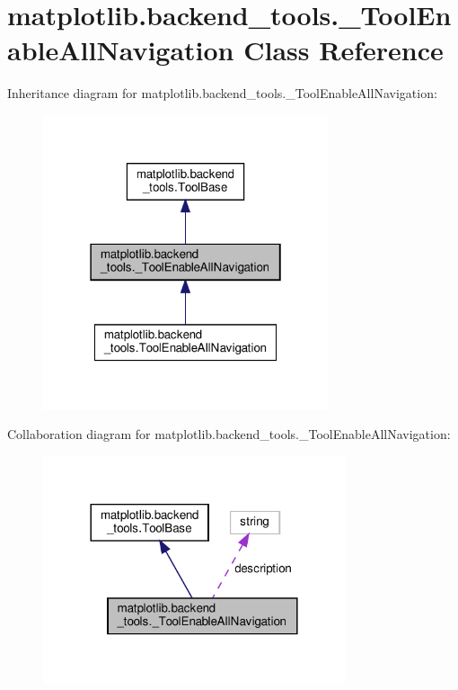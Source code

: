 \hypertarget{classmatplotlib_1_1backend__tools_1_1__ToolEnableAllNavigation}{}\section{matplotlib.\+backend\+\_\+tools.\+\_\+\+Tool\+Enable\+All\+Navigation Class Reference}
\label{classmatplotlib_1_1backend__tools_1_1__ToolEnableAllNavigation}


Inheritance diagram for matplotlib.\+backend\+\_\+tools.\+\_\+\+Tool\+Enable\+All\+Navigation\+:
\nopagebreak
\begin{figure}[H]
\begin{center}
\leavevmode
\includegraphics[width=238pt]{classmatplotlib_1_1backend__tools_1_1__ToolEnableAllNavigation__inherit__graph}
\end{center}
\end{figure}


Collaboration diagram for matplotlib.\+backend\+\_\+tools.\+\_\+\+Tool\+Enable\+All\+Navigation\+:
\nopagebreak
\begin{figure}[H]
\begin{center}
\leavevmode
\includegraphics[width=252pt]{classmatplotlib_1_1backend__tools_1_1__ToolEnableAllNavigation__coll__graph}
\end{center}
\end{figure}
